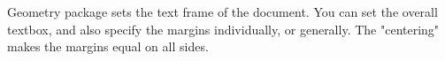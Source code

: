 \documentclass{article}%
\begin{document}

        Geometry package sets the text frame of the document. You can set the overall textbox, and also specify the margins individually, or generally. The "centering" makes the margins equal on all sides.
\end{document}
